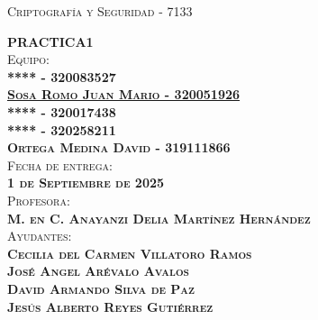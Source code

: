 \begin{titlepage}
\begin{minipage}[c][0.81\textheight][t]{0.75\textwidth}
\begin{center}
			{\large\scshape Criptografía y Seguridad - 7133}\\[.2in]
			
			\vspace{2cm}            
			
			\textsc{\LARGE \textbf{P}\hspace{1cm}\textbf{R}\hspace{1cm}\textbf{A}\hspace{1cm}\textbf{C}\hspace{1cm}\textbf{T}\hspace{1cm}\textbf{I}\hspace{1cm}\textbf{C}\hspace{1cm}\textbf{A}\hspace{1.3cm}\textbf{1}}\\[2cm]
			\textsc{\Large{Equipo:}\normalsize \\
                \vspace{.3cm}
				\textbf{**** - 320083527 \\
                \vspace{.2cm}
				\href{https://github.com/JuanSosaCiencias}{{Sosa Romo Juan Mario - 320051926}} \\
                \vspace{.2cm}
				**** - 320017438 \\
                \vspace{.2cm}
                **** - 320258211 \\
                \vspace{.2cm}
                Ortega Medina David - 319111866}}\\[0.5cm]     
			
			\textsc{{Fecha de entrega: \\ \textbf{1 de Septiembre de 2025}}}\\[0.5cm]        
			
			\textsc{{Profesora: \\ \textbf{M. en C. Anayanzi Delia Martínez Hernández}}}\\[0.5cm]  
			
			\textsc{Ayudantes: \\ \textbf{Cecilia del Carmen Villatoro Ramos \\ José Angel Arévalo Avalos \\ David Armando Silva de Paz \\ Jesús Alberto Reyes Gutiérrez
			} }
			
			
			\vspace{0.5cm}
		\end{center}
	\end{minipage}
\end{titlepage}
